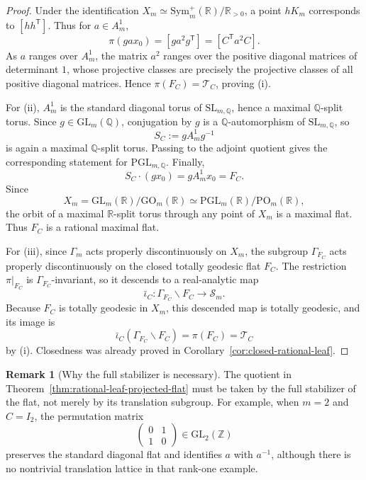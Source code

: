 \documentclass[11pt,letterpaper]{amsart}
\newcommand{\Q}{\mathbb{Q}}
\newcommand{\Z}{\mathbb{Z}}
\newcommand{\R}{\mathbb{R}}
\newcommand{\GL}{\mathrm{GL}}
\newcommand{\GO}{\mathrm{GO}}
\newcommand{\Sym}{\mathrm{Sym}}
\theoremstyle{plain}
\theoremstyle{definition}
\newtheorem{remark}[theorem]{Remark}
\begin{document}
\begin{proof}
Under the identification
\(X_m\simeq \Sym_m^+(\R)/\R_{>0}\), a point \(hK_m\) corresponds to
\([hh^{\mathsf T}]\). Thus for \(a\in A_m^1\),
\[
\pi(ga x_0)
=
[ga^2g^{\mathsf T}]
=
[C^{\mathsf T}a^2C].
\]
As \(a\) ranges over \(A_m^1\), the matrix \(a^2\) ranges over the positive
diagonal matrices of determinant \(1\), whose projective classes are precisely
the projective classes of all positive diagonal matrices. Hence
\(\pi(F_C)=\mathcal T_C\), proving \textup{(i)}.

For \textup{(ii)}, \(A_m^1\) is the standard diagonal torus of
\(\mathrm{SL}_{m,\Q}\), hence a maximal \(\Q\)-split torus.  Since
\(g\in\GL_m(\Q)\), conjugation by \(g\) is a \(\Q\)-automorphism of
\(\mathrm{SL}_{m,\Q}\), so
\[
S_C:=gA_m^1g^{-1}
\]
is again a maximal \(\Q\)-split torus.  Passing to the adjoint quotient gives
the corresponding statement for \(\mathrm{PGL}_{m,\Q}\).  Finally,
\[
S_C\cdot(gx_0)=gA_m^1x_0=F_C.
\]
Since
\[
X_m=\GL_m(\R)/\GO_m(\R)
\simeq
\mathrm{PGL}_m(\R)/\mathrm{PO}_m(\R),
\]
the orbit of a maximal \(\R\)-split torus through any point of \(X_m\) is a
maximal flat.  Thus \(F_C\) is a rational maximal flat.

For \textup{(iii)}, since \(\Gamma_m\) acts properly discontinuously on \(X_m\),
the subgroup \(\Gamma_{F_C}\) acts properly discontinuously on the closed
totally geodesic flat \(F_C\). The restriction \(\pi|_{F_C}\) is
\(\Gamma_{F_C}\)-invariant, so it descends to a real-analytic map
\[
\bar\iota_C:\Gamma_{F_C}\backslash F_C\longrightarrow \mathscr S_m.
\]
Because \(F_C\) is totally geodesic in \(X_m\), this descended map is totally
geodesic, and its image is
\[
\bar\iota_C(\Gamma_{F_C}\backslash F_C)=\pi(F_C)=\mathcal T_C
\]
by \textup{(i)}. Closedness was already proved in
Corollary~\ref{cor:closed-rational-leaf}.
\end{proof}

\begin{remark}[Why the full stabilizer is necessary]
\label{rem:full-stabilizer-necessary}
The quotient in
Theorem~\ref{thm:rational-leaf-projected-flat} must be taken by the full
stabilizer of the flat, not merely by its translation subgroup.  For example,
when \(m=2\) and \(C=I_2\), the permutation matrix
\[
\begin{pmatrix}0&1\\ 1&0\end{pmatrix}\in \GL_2(\Z)
\]
preserves the standard diagonal flat and identifies \(a\) with \(a^{-1}\),
although there is no nontrivial translation lattice in that rank-one example.
\end{remark}
\end{document}
